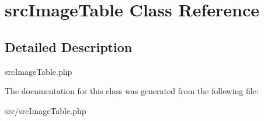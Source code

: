 \hypertarget{classsrc_image_table}{
\section{src\-Image\-Table \-Class \-Reference}
\label{classsrc_image_table}
}


\subsection{\-Detailed \-Description}
src\-Image\-Table.\-php 

\-The documentation for this class was generated from the following file\-:\begin{DoxyCompactItemize}
\item 
src/src\-Image\-Table.\-php\end{DoxyCompactItemize}
